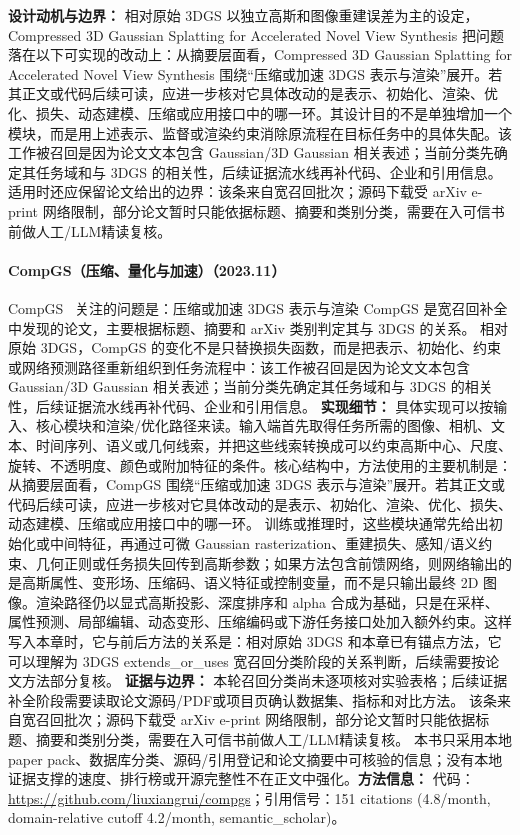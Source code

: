 \textbf{设计动机与边界：} 相对原始 3DGS 以独立高斯和图像重建误差为主的设定，Compressed 3D Gaussian Splatting for Accelerated Novel View Synthesis 把问题落在以下可实现的改动上：从摘要层面看，Compressed 3D Gaussian Splatting for Accelerated Novel View Synthesis 围绕“压缩或加速 3DGS 表示与渲染”展开。若其正文或代码后续可读，应进一步核对它具体改动的是表示、初始化、渲染、优化、损失、动态建模、压缩或应用接口中的哪一环。其设计目的不是单独增加一个模块，而是用上述表示、监督或渲染约束消除原流程在目标任务中的具体失配。该工作被召回是因为论文文本包含 Gaussian/3D Gaussian 相关表述；当前分类先确定其任务域和与 3DGS 的相关性，后续证据流水线再补代码、企业和引用信息。适用时还应保留论文给出的边界：该条来自宽召回批次；源码下载受 arXiv e-print 网络限制，部分论文暂时只能依据标题、摘要和类别分类，需要在入可信书前做人工/LLM精读复核。
\paragraph{CompGS（压缩、量化与加速）（2023.11）}
CompGS~\cite{2311_18159} 关注的问题是：压缩或加速 3DGS 表示与渲染 CompGS 是宽召回补全中发现的论文，主要根据标题、摘要和 arXiv 类别判定其与 3DGS 的关系。
相对原始 3DGS，CompGS 的变化不是只替换损失函数，而是把表示、初始化、约束或网络预测路径重新组织到任务流程中：该工作被召回是因为论文文本包含 Gaussian/3D Gaussian 相关表述；当前分类先确定其任务域和与 3DGS 的相关性，后续证据流水线再补代码、企业和引用信息。
\textbf{实现细节：} 具体实现可以按输入、核心模块和渲染/优化路径来读。输入端首先取得任务所需的图像、相机、文本、时间序列、语义或几何线索，并把这些线索转换成可以约束高斯中心、尺度、旋转、不透明度、颜色或附加特征的条件。核心结构中，方法使用的主要机制是：从摘要层面看，CompGS 围绕“压缩或加速 3DGS 表示与渲染”展开。若其正文或代码后续可读，应进一步核对它具体改动的是表示、初始化、渲染、优化、损失、动态建模、压缩或应用接口中的哪一环。 训练或推理时，这些模块通常先给出初始化或中间特征，再通过可微 Gaussian rasterization、重建损失、感知/语义约束、几何正则或任务损失回传到高斯参数；如果方法包含前馈网络，则网络输出的是高斯属性、变形场、压缩码、语义特征或控制变量，而不是只输出最终 2D 图像。渲染路径仍以显式高斯投影、深度排序和 alpha 合成为基础，只是在采样、属性预测、局部编辑、动态变形、压缩编码或下游任务接口处加入额外约束。这样写入本章时，它与前后方法的关系是：相对原始 3DGS 和本章已有锚点方法，它可以理解为 3DGS extends\_or\_uses 宽召回分类阶段的关系判断，后续需要按论文方法部分复核。
\textbf{证据与边界：} 本轮召回分类尚未逐项核对实验表格；后续证据补全阶段需要读取论文源码/PDF或项目页确认数据集、指标和对比方法。 该条来自宽召回批次；源码下载受 arXiv e-print 网络限制，部分论文暂时只能依据标题、摘要和类别分类，需要在入可信书前做人工/LLM精读复核。 本书只采用本地 paper pack、数据库分类、源码/引用登记和论文摘要中可核验的信息；没有本地证据支撑的速度、排行榜或开源完整性不在正文中强化。\textbf{方法信息：} 代码：\url{https://github.com/liuxiangrui/compgs}；引用信号：151 citations (4.8/month, domain-relative cutoff 4.2/month, semantic\_scholar)。
